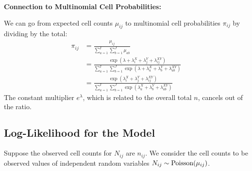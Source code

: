 \documentclass[11pt]{elegantbook}
\begin{document}
\textbf{Connection to Multinomial Cell Probabilities:}

We can go from expected cell counts $\mu_{i j}$ to multinomial cell probabilities $\pi_{i j}$ by dividing by the total:
$$
\begin{aligned}
\pi_{i j} & =\frac{\mu_{i j}}{\sum_{a=1}^I \sum_{b=1}^J \mu_{a b}} \\
& =\frac{\exp \left(\lambda+\lambda_i^X+\lambda_j^Y+\lambda_{i j}^{X Y}\right)}{\sum_{a=1}^I \sum_{b=1}^J \exp \left(\lambda+\lambda_a^X+\lambda_b^Y+\lambda_{a b}^{X Y}\right)} \\
& =\frac{\exp \left(\lambda_i^X+\lambda_j^Y+\lambda_{i j}^{X Y}\right)}{\sum_{a=1}^I \sum_{b=1}^J \exp \left(\lambda_a^X+\lambda_b^Y+\lambda_{a b}^{X Y}\right)}
\end{aligned}
$$
The constant multiplier $e^\lambda$, which is related to the overall total $n$, cancels out of the ratio.

\subsection{Log-Likelihood for the Model}
Suppose the observed cell counts for $N_{ij}$ are $n_{ij}$. We consider the cell counts to be observed values of independent random variables $N_{ij} \sim \textnormal{Poisson}(\mu_{ij})$.
\end{document}

